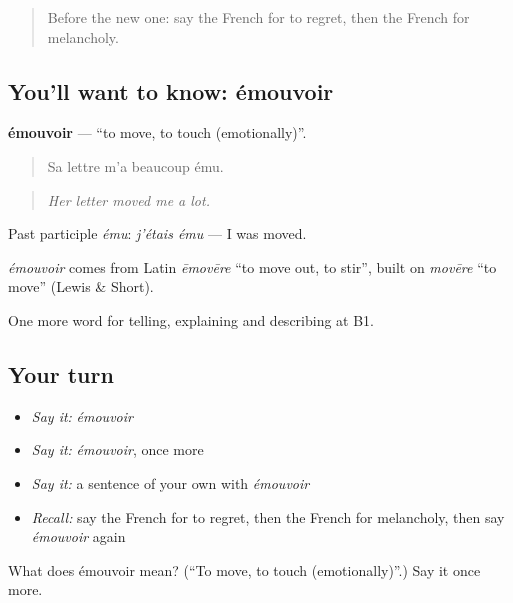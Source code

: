 \begin{quote}
Before the new one: say the French for to regret, then the French for melancholy.
\end{quote}

\subsection*{You'll want to know: émouvoir}
\textbf{émouvoir} — \textquotedblleft{}to move, to touch (emotionally)\textquotedblright{}.

\begin{quote}
Sa lettre m'a beaucoup ému.
\end{quote}

\begin{quote}
\emph{Her letter moved me a lot.}
\end{quote}

Past participle \emph{ému}: \emph{j'étais ému} — I was moved.

\begin{cousinweb}
\emph{émouvoir} comes from Latin \emph{ēmovēre} \textquotedblleft{}to move out, to stir\textquotedblright{}, built on \emph{movēre} \textquotedblleft{}to move\textquotedblright{} (Lewis \& Short).
\end{cousinweb}

\begin{grammarlens}[title={What you've built}]
One more word for telling, explaining and describing at B1.
\end{grammarlens}

\subsection*{Your turn}
\begin{itemize}
\raggedright
  \item \emph{Say it:} \emph{émouvoir}
  \item \emph{Say it:} \emph{émouvoir}, once more
  \item \emph{Say it:} a sentence of your own with \emph{émouvoir}
  \item \emph{Recall:} say the French for to regret, then the French for melancholy, then say \emph{émouvoir} again
\end{itemize}

\begin{tcolorbox}[breakable,colback=teal!4,colframe=teal!35!black,title={Before you move on}]
What does émouvoir mean? (\textquotedblleft{}To move, to touch (emotionally)\textquotedblright{}.) Say it once more.
\end{tcolorbox}
